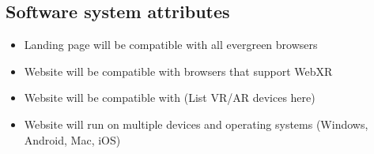 \subsection{Software system attributes}
\begin{itemize}
    \item Landing page will be compatible with all evergreen browsers
    \item Website will be compatible with browsers that support WebXR
    \item Website will be compatible with (List VR/AR devices here)
    \item Website will run on multiple devices and operating systems (Windows, Android, Mac, iOS)
\end{itemize}
